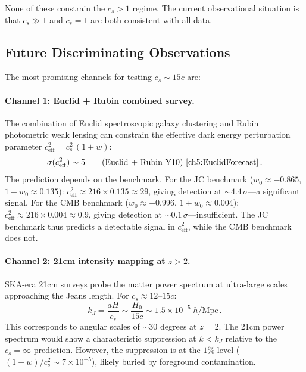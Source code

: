 None of these constrain the $c_s > 1$ regime. The current observational situation is that $c_s \gg 1$ and $c_s = 1$ are both consistent with all data.

\subsection{Future Discriminating Observations}
\label{sec:5-future}

The most promising channels for testing $c_s \sim 15c$ are:

\paragraph{Channel 1: Euclid + Rubin combined survey.}

The combination of Euclid spectroscopic galaxy clustering and Rubin photometric weak lensing can constrain the effective dark energy perturbation parameter $c_\mathrm{eff}^2 = c_s^2\,(1+w)$:
\begin{equation}
  \sigma(c_\mathrm{eff}^2) \sim 5 \qquad\text{(Euclid + Rubin Y10)}~\cite{ch5:EuclidForecast}\,.
  \label{eq:5-28}
\end{equation}
The prediction depends on the benchmark. For the JC benchmark ($w_0 \approx -0.865$, $1+w_0 \approx 0.135$): $c_\mathrm{eff}^2 \approx 216 \times 0.135 \approx 29$, giving detection at ${\sim}4.4\,\sigma$---a significant signal. For the CMB benchmark ($w_0 \approx -0.996$, $1+w_0 \approx 0.004$): $c_\mathrm{eff}^2 \approx 216 \times 0.004 \approx 0.9$, giving detection at ${\sim}0.1\,\sigma$---insufficient. The JC benchmark thus predicts a detectable signal in $c_\mathrm{eff}^2$, while the CMB benchmark does not.

\paragraph{Channel 2: 21cm intensity mapping at $z > 2$.}

SKA-era 21cm surveys probe the matter power spectrum at ultra-large scales approaching the Jeans length. For $c_s \approx 12$--$15c$:
\begin{equation}
  k_J = \frac{aH}{c_s} \sim \frac{H_0}{15c} \sim 1.5 \times 10^{-5}\;h/\mathrm{Mpc}\,.
  \label{eq:5-29}
\end{equation}
This corresponds to angular scales of ${\sim}30$ degrees at $z = 2$. The 21cm power spectrum would show a characteristic suppression at $k < k_J$ relative to the $c_s = \infty$ prediction. However, the suppression is at the $1\%$ level ($(1+w)/c_s^2 \sim 7 \times 10^{-5}$), likely buried by foreground contamination.

